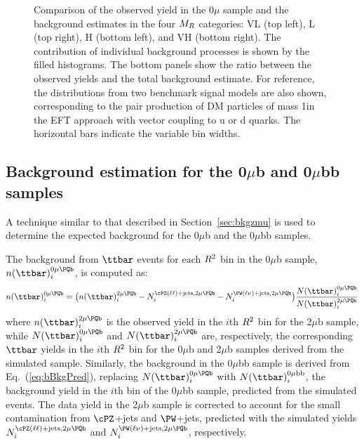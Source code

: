 \begin{figure}
 \caption{Comparison of the observed yield in the $0\mu$ sample and the
   background estimates in the four $M_R$ categories:
   VL (top left), L (top right), H (bottom left), and VH (bottom right). The
   contribution of individual background processes is shown by the
   filled histograms. The bottom panels show the ratio
   between the observed yields and the total background estimate. For reference, the distributions from two
   benchmark signal models are also shown, corresponding to the pair
   production of DM particles of mass 1\GeV in the EFT approach with
   vector coupling to u or d quarks. The horizontal bars indicate
the variable bin widths.\label{fig:0muSignalBkg1GeV} }
\end{figure}
\subsection{Background estimation for the \texorpdfstring{0$\mu$b and 0$\mu$bb}{0 mu b and 0 mu bb} samples}
A technique similar to that described in Section~\ref{sec:bkgzmu} is used to determine the
expected background for the 0$\mu$b and the 0$\mu$bb samples.

The background from $\ttbar$ events for each $R^2$ bin in the
0$\mu$b sample, $n(\ttbar)_{i}^{0\mu\PQb}$, is computed as:
\begin{equation}
  n(\ttbar)_{i}^{0\mu\PQb} =  \bigl(n(\ttbar)_{i}^{2\mu\PQb} - N_{i}^{\cPZ(\ell
    \ell)+\text{jets},2\mu\PQb} - N_{i}^{\PW(\ell\nu)+\text{jets},2\mu\PQb}\bigr)
\frac{N(\ttbar)_{i}^{0\mu\PQb}}{N(\ttbar)_{i}^{2\mu\PQb}}\label{eq:bBkgPred}
\end{equation}
where $n(\ttbar)_{i}^{2\mu\PQb}$ is the observed yield in the $i$th $R^2$
bin for the 2$\mu$b sample, while $N(\ttbar)_{i}^{0\mu\PQb}$ and
$N(\ttbar)_{i}^{2\mu\PQb}$ are, respectively, the corresponding $\ttbar$ yields in the $i$th $R^2$
bin for the 0$\mu$b and 2$\mu$b samples derived from
the simulated \ttbar sample. Similarly, the \ttbar background in the
0$\mu$bb sample is derived from Eq.~(\ref{eq:bBkgPred}), replacing
$N(\ttbar)_{i}^{0\mu\PQb}$ with $N(\ttbar)_{i}^{0\mu\mathrm{bb}}$, the \ttbar
background yield in the $i$th bin of the 0$\mu$bb sample, predicted
from the simulated \ttbar events. The data yield in the 2$\mu$b sample is
corrected to account for the small contamination from $\cPZ$+jets and
 $\PW$+jets, predicted with the simulated yields $N_{i}^{\cPZ(\ell\ell)+\text{jets},2\mu\PQb}$ and
    $N_{i}^{\PW(\ell\nu)+\text{jets},2\mu\PQb}$, respectively.



